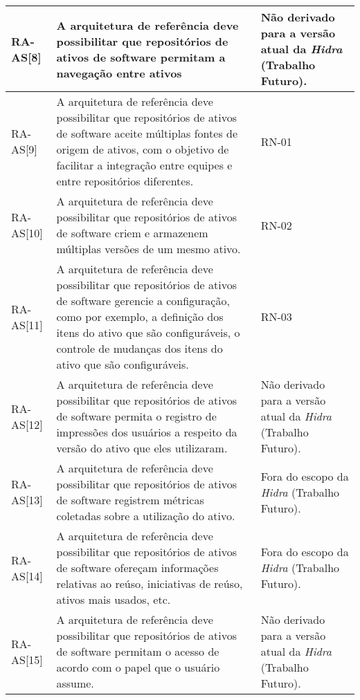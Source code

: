 \begin{longtable}{ | l | p{9cm} | p{3cm} |}
    RA-AS[8] 
    & A arquitetura de referência deve possibilitar que  repositórios de ativos de software permitam a  navegação entre ativos 
    & Não derivado para a versão atual da \textit{Hidra} (Trabalho Futuro). 
    \\ \hline
    
    RA-AS[9] 
    & A arquitetura de referência deve possibilitar que  repositórios de ativos de software aceite múltiplas  fontes de origem de ativos, com o objetivo de facilitar  a integração entre equipes e entre repositórios  diferentes.  
    & RN-01
    \\ \hline
 
    RA-AS[10]
    & A arquitetura de referência deve possibilitar que  repositórios de ativos de software criem e armazenem  múltiplas versões de um mesmo ativo.
    & RN-02
    \\ \hline

    RA-AS[11] 
    & A arquitetura de referência deve possibilitar que  repositórios de ativos de software gerencie a  configuração, como por exemplo, a definição dos itens  do ativo que são configuráveis, o controle de  mudanças dos itens do ativo que são configuráveis.
    & RN-03
    \\ \hline
    
    RA-AS[12] 
    &A arquitetura de referência deve possibilitar que  repositórios de ativos de software permita o registro de  impressões dos usuários a respeito da versão do ativo  que eles utilizaram. 
    & Não derivado para a versão atual da \textit{Hidra} (Trabalho Futuro).
    \\ \hline

    RA-AS[13] 
    & A arquitetura de referência deve possibilitar que  repositórios de ativos de software registrem métricas  coletadas sobre a utilização do ativo.
    & Fora do escopo da \textit{Hidra} (Trabalho Futuro).
    \\ \hline

    RA-AS[14] 
    & A arquitetura de referência deve possibilitar que  repositórios de ativos de software ofereçam  informações relativas ao reúso, iniciativas de reúso,  ativos mais usados, etc.
    & Fora do escopo da \textit{Hidra} (Trabalho Futuro). 
    \\ \hline
    
    RA-AS[15] 
    & A arquitetura de referência deve possibilitar que  repositórios de ativos de software permitam o acesso de acordo com o papel que o usuário assume.
    & Não derivado para a versão atual da \textit{Hidra} (Trabalho Futuro). 
    \\ \hline


\end{longtable}
